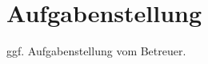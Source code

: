 \thispagestyle{empty}

\chapter*{Aufgabenstellung} %
\label{cha:aufgabenstellung}
ggf. Aufgabenstellung vom Betreuer.
